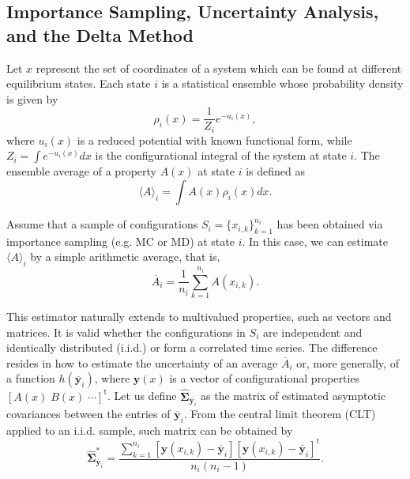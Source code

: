 \documentclass[journal=jctcce,manuscript=article,layout=twocolumn]{achemso}
\newcommand{\mt}[1]{\boldsymbol{\mathbf{#1}}}   %
\newcommand{\vt}[1]{\boldsymbol{\mathbf{#1}}}   %
\newcommand{\tr}[1]{#1^\text{t}}                %
\newcommand{\avg}[1]{\overline{#1}}             %
\begin{document}
\subsection{Importance Sampling, Uncertainty Analysis, and the Delta Method}
\label{sec:definitions}

Let $x$ represent the set of coordinates of a system which can be found at different equilibrium states. Each state $i$ is a statistical ensemble whose probability density is given by
\begin{equation}
\label{eq:state_prob_density}
\rho_i(x) = \frac{1}{Z_i} e^{-u_i(x)},
\end{equation}
where $u_i(x)$ is a reduced potential \cite{Shirts_2008, Chodera_2011_2} with known functional form, while $Z_i = \int e^{-u_i(x)}dx$ is the configurational integral of the system at state $i$. The ensemble average of a property $A(x)$ at state $i$ is defined as
\begin{equation}
\label{eq:ensemble average}
\langle A \rangle_i = \int A(x)\rho_i(x)dx.
\end{equation}

Assume that a sample of configurations $S_i = \{x_{i,k}\}_{k=1}^{n_i}$ has been obtained via importance sampling \cite{Allen_1987} (e.g. MC or MD) at state $i$. In this case, we can estimate $\langle A \rangle_i$ by a simple arithmetic average, that is,
\begin{equation}
\label{eq:average estimator}
\avg A_i = \frac{1}{n_i} \sum_{k=1}^{n_i} A(x_{i,k}).
\end{equation}

This estimator naturally extends to multivalued properties, such as vectors and matrices. It is valid whether the configurations in $S_i$ are independent and identically distributed (i.i.d.) or form a correlated time series. The difference resides in how to estimate the uncertainty of an average $\avg A_i$ or, more generally, of a function $h(\avg {\vt y}_i)$, where $\vt y(x)$ is a vector of configurational properties $\tr{[A(x) \; B(x) \; \cdots]}$. Let us define $\hat{\mt \Sigma}_{\avg{\vt y}_i}$ as the matrix of estimated asymptotic covariances between the entries of $\avg{\vt y}_i$. From the central limit theorem (CLT) applied to an i.i.d. sample, such matrix can be obtained by
\begin{equation}
\label{eq:asymptotic covariance IID}
\hat{\mt \Sigma}^\ast_{\avg{\vt y}_i} = \frac{\sum\limits_{k=1}^{n_i} \left[\vt y(x_{i,k}) - \avg{\vt y}_i\right] \tr{\left[\vt y(x_{i,k}) - \avg{\vt y}_i\right]}}{n_i(n_i - 1)}.
\end{equation}
\end{document}
